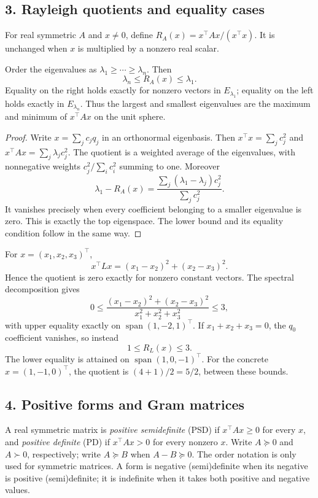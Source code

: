 \subsection*{3. Rayleigh quotients and equality cases}
For real symmetric \(A\) and \(x\ne0\), define
\(R_A(x)=x^\top Ax/(x^\top x)\).
It is unchanged when \(x\) is multiplied by a nonzero real scalar.

\begin{theorem}\label{thm:09:rayleigh}
Order the eigenvalues as \(\lambda_1\geqslant\cdots\geqslant\lambda_n\).
Then
\[
 \lambda_n\leqslant R_A(x)\leqslant\lambda_1.
\]
Equality on the right holds exactly for nonzero vectors in
\(E_{\lambda_1}\); equality on the left holds exactly in \(E_{\lambda_n}\).
Thus the largest and smallest eigenvalues are the maximum and minimum
of \(x^\top Ax\) on the unit sphere.
\end{theorem}
\begin{proof}
Write \(x=\sum_j c_jq_j\) in an orthonormal eigenbasis.
Then \(x^\top x=\sum_jc_j^2\) and \(x^\top Ax=\sum_j\lambda_jc_j^2\).
The quotient is a weighted average of the eigenvalues, with nonnegative
weights \(c_j^2/\sum_i c_i^2\) summing to one.
Moreover
\[
 \lambda_1-R_A(x)
 =\frac{\sum_j(\lambda_1-\lambda_j)c_j^2}{\sum_jc_j^2}.
\]
It vanishes precisely when every coefficient belonging to a smaller
eigenvalue is zero. This is exactly the top eigenspace. The lower bound
and its equality condition follow in the same way.
\end{proof}

\begin{example}
For \(x=(x_1,x_2,x_3)^\top\),
\[
 x^\top Lx=(x_1-x_2)^2+(x_2-x_3)^2.
\]
Hence the quotient is zero exactly for nonzero constant vectors.
The spectral decomposition gives
\[
 0\leqslant\frac{(x_1-x_2)^2+(x_2-x_3)^2}
                       {x_1^2+x_2^2+x_3^2}\leqslant3,
\]
with upper equality exactly on \(\operatorname{span}(1,-2,1)^\top\).
If \(x_1+x_2+x_3=0\), the \(q_0\) coefficient vanishes, so instead
\[
 1\leqslant R_L(x)\leqslant3.
\]
The lower equality is attained on \(\operatorname{span}(1,0,-1)^\top\).
For the concrete \(x=(1,-1,0)^\top\), the quotient is
\((4+1)/2=5/2\), between these bounds.
\end{example}

\subsection*{4. Positive forms and Gram matrices}
A real symmetric matrix is \emph{positive semidefinite} (PSD) if
\(x^\top Ax\geqslant0\) for every \(x\), and \emph{positive definite}
(PD) if \(x^\top Ax>0\) for every nonzero \(x\).
Write \(A\succeq0\) and \(A\succ0\), respectively; write
\(A\succeq B\) when \(A-B\succeq0\).
The order notation is only used for symmetric matrices.
A form is negative (semi)definite when its negative is positive
(semi)definite; it is indefinite when it takes both positive and
negative values.

